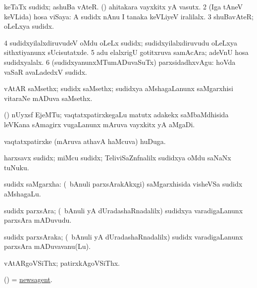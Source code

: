 \noindent
\gl{\pagu}
\bmng
\bnum
{}  
\banum
{} keTaTx sudidx; ashuBa vAteR. 
 (\AmA) ahitakara vayxkitx yA vasutx. 
\eanum
\numie
\num{2}  (Iga tAneV keVLida) hosa viSaya:  A sudidx nAnu I tanaka keVLiyeV iralilalx. 
\num{3}  shuBavAteR; oLeLxya sudidx. 
\num{4}  sudidxyilalxdiruvudeV oMdu oLeLx sudidx; sudidxyilalxdiruvudu oLeLxya sithxtiyanunx sUcisutatxde. 
\num{5}  adu elalxrigU gotitxruva samAcAra; adeVnU hosa sudidxyalalx. 
\num{6}  (sudidxyanunxMTumADuvaSuTx) parxsidadhxvAgu:  hoVda vaSaR avaLadedxV sudidx. 
\enum
\emng
\eentry

\bentry
{}
\gl{\nA}
\bmng
vAtAR saMsethx; sudidx saMsethx; sudidxya aMshagaLanunx saMgarxhisi vitaraNe mADuva saMsethx. 
\emng
\eentry

\bentry
{}
\gl{\nA}
\bmng
(\birx) nUyxsf EjeMTu; vaqtatxpatirxkegaLu matutx adakekx saMbaMdhisida leVKana sAmagirx \mo vugaLanunx mAruva vayxkitx yA aMgaDi. 
\emng
\eentry

\bentry
{}
\gl{\nA}
\bmng
vaqtatxpatirxke (mAruva athavA haMcuva) huDuga. 
\emng
\eentry

\bentry
{}
\gl{\nA}
\bmng
harxsavx sudidx; miMcu sudidx; TeliviSaZnfnalilx sudidxya oMdu saNaNx tuNuku. 
\emng
\eentry

\bentry
{}
\gl{\nA}
\bmng
sudidx saMgarxha: (\kanmu\ bAnuli parxsArakAkxgi) saMgarxhisida visheVSa sudidx aMshagaLu. 
\emng
\eentry

\bentry
{}
\gl{\nA}
\bmng
sudidx parxsAra; (\kanmu\ bAnuli yA dUradashaRnadalilx) sudidxya varadigaLanunx parxsAra mADuvudu. 
\emng
\eentry

\bentry
{}
\gl{\nA}
\bmng
sudidx parxsAraka; (\kanmu\ bAnuli yA dUradashaRnadalilx) sudidx varadigaLanunx parxsAra mADuvavanu(Lu). 
\emng
\eentry

\bentry
{}
\gl{\nA}
\bmng
vAtARgoVSiThx; patirxkAgoVSiThx. 
\emng
\eentry

\bentry
{}
\gl{\nA}
\bmng
(\ame) = \hyperlink{newsagent}{newsagent}. 
\emng
\eentry

